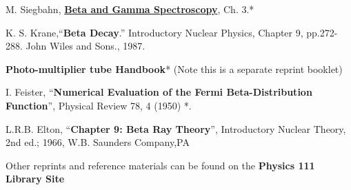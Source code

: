 \documentclass{../lab}
\begin{document}
\begin{thebibliography}{}
\label{sec:References}
     M. Siegbahn, \href{https://archive.org/details/betagammarayspec00sieguoft/betagammarayspec00sieguoft/page/x/mode/2up} %
    {\textbf{Beta and Gamma Spectroscopy}}, Ch. 3.*

     K. S. Krane,``\textbf{Beta Decay}.'' Introductory Nuclear Physics, Chapter 9, pp.272-288. John Wiles and Sons., 1987.

     \textbf{Photo-multiplier tube Handbook}* (Note this is a separate reprint booklet)

     I. Feister, ``\textbf{Numerical Evaluation of the Fermi Beta-Distribution Function}'', Physical Review 78, 4 (1950) *\*.

     L.R.B. Elton, ``\textbf{Chapter 9: Beta Ray Theory}'', Introductory Nuclear Theory, 2nd ed.; 1966, W.B. Saunders Company,PA
\end{thebibliography}

Other reprints and reference materials can be found on the \textbf{Physics 111 Library Site}
\end{document}
